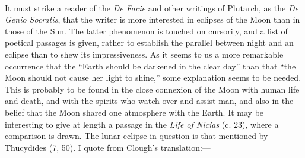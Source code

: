 \documentclass[a4paper, 11pt, oneside, polutonikogreek, english]{article}
\begin{document}
\paragraph{}
It must strike a reader of the \emph{De Facie} and other writings of Plutarch, as the \emph{De Genio Socratis}, that the writer is more interested in eclipses of the Moon than in those of the Sun. The latter phenomenon is touched on cursorily, and a list of poetical passages is given, rather to establish the parallel between night and an eclipse than to shew its impressiveness. As it seems to us a more remarkable occurrence that the ``Earth should be darkened in the clear day'' than that ``the Moon should not cause her light to shine,'' some explanation seems to be needed. This is probably to be found in the close connexion of the Moon with human life and death, and with the spirits who watch over and assist man, and also in the belief that the Moon shared one atmosphere with the Earth. It may be interesting to give at length a passage in the \emph{Life of Nicias} (c. 23), where a comparison is drawn. The lunar eclipse in question is that mentioned by Thucydides (7, 50). I quote from Clough's translation:---
\end{document}
